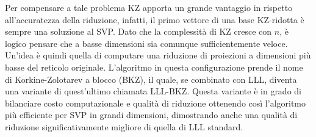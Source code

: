 Per compensare a tale problema KZ apporta un 
grande vantaggio in rispetto all'accuratezza della riduzione, infatti, il primo vettore
di una base KZ-ridotta è sempre una soluzione al SVP. Dato che la complessità di KZ
cresce con $n$, è logico pensare che a basse dimensioni sia comunque sufficientemente
veloce. Un'idea è quindi quella di computare
una riduzione di proiezioni a dimensioni più basse del reticolo originale.
L'algoritmo in questa configurazione prende il nome di Korkine-Zolotarev a blocco (BKZ), 
il quale, se combinato con LLL, diventa una variante di quest'ultimo chiamata LLL-BKZ. Questa
variante è in grado di bilanciare costo computazionale e qualità di riduzione ottenendo così
l'algoritmo più efficiente per SVP in grandi dimensioni, dimostrando anche una qualità di riduzione
significativamente migliore di quella di LLL standard. 